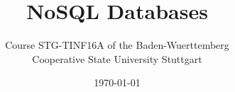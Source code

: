 \documentclass[
  12pt,
  a4paper,
  parskip,
  openany
]{scrbook}
\title{NoSQL Databases}
\author{Course STG-TINF16A of the Baden-Wuerttemberg\\ Cooperative State University Stuttgart}
\date{\today}
\begin{document}
\maketitle
\tableofcontents


\printglossaries















\printbibliography

\appendix


\end{document}
